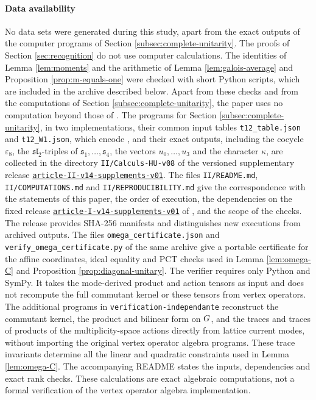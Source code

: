 \documentclass[leqno]{article}
\let\cal\relax
\newcommand{\cal}{\mathcal}
\newcommand{\epsi}{\varepsilon}
\numberwithin{equation}{section}
\begin{document}
\paragraph{Data availability} No data sets were generated during this study, apart from the exact outputs of the computer programs of Section \ref{subsec:complete-unitarity}. The proofs of Section \ref{sec:recognition} do not use computer calculations. The identities of Lemma \ref{lem:moments} and the arithmetic of Lemma \ref{lem:galois-average} and Proposition \ref{prop:m-equals-one} were checked with short Python scripts, which are included in the archive described below. Apart from these checks and from the computations of Section \ref{subsec:complete-unitarity}, the paper uses no computation beyond those of \cite{Arh26}. The programs for Section \ref{subsec:complete-unitarity}, in two implementations, their common input tables \texttt{t12\_table.json} and \texttt{t12\_W1.json}, which encode \cite[Table 2]{Arh26}, and their exact outputs, including the cocycle $\epsi_8$, the $\mathfrak{sl}_2$-triples of $\mathfrak s_1, \ldots, \mathfrak s_4$, the vectors $u_0, \ldots, u_3$ and the character $\kappa$, are collected in the directory \texttt{II/Calculs-HU-v08} of the versioned supplementary release \href{https://github.com/cedricarhancet/haagerup-c8/releases/tag/article-II-v14-supplements-v01}{\texttt{article-II-v14-supplements-v01}}. The files \texttt{II/README.md}, \texttt{II/COMPUTATIONS.md} and \texttt{II/REPRODUCIBILITY.md} give the correspondence with the statements of this paper, the order of execution, the dependencies on the fixed release \href{https://github.com/cedricarhancet/haagerup-c8/releases/tag/article-I-v14-supplements-v01}{\texttt{article-I-v14-supplements-v01}} of \cite{Arh26}, and the scope of the checks. The release provides SHA-256 manifests and distinguishes new executions from archived outputs. The files \texttt{omega\_certificate.json} and \texttt{verify\_omega\_certificate.py} of the same archive give a portable certificate for the affine coordinates, ideal equality and PCT checks used in Lemma \ref{lem:omega-C} and Proposition \ref{prop:diagonal-unitary}. The verifier requires only Python and SymPy. It takes the mode-derived product and action tensors as input and does not recompute the full commutant kernel or these tensors from vertex operators. The additional programs in \texttt{verification-independante} reconstruct the commutant kernel, the product and bilinear form on $\cal G$, and the traces and traces of products of the multiplicity-space actions directly from lattice current modes, without importing the original vertex operator algebra programs. These trace invariants determine all the linear and quadratic constraints used in Lemma \ref{lem:omega-C}. The accompanying README states the inputs, dependencies and exact rank checks. These calculations are exact algebraic computations, not a formal verification of the vertex operator algebra implementation.
\end{document}
